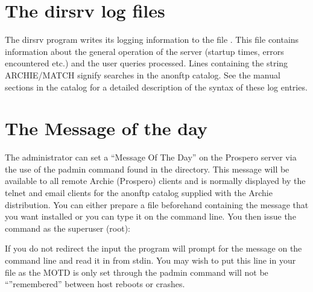 \section{The dirsrv log files}

The dirsrv program writes its logging information to the file
. This file contains information about the general operation of
the server (startup times, errors encountered etc.) and the user queries
processed. Lines containing the string ARCHIE/MATCH signify searches in the
anonftp catalog. See the manual sections in the catalog for a detailed
description of the syntax of these log entries.






\section{The Message of the day}

The administrator can set a ``Message Of The Day'' on the Prospero server via
the use of the padmin command found in the  directory. This
message will be available to all remote Archie (Prospero) clients and is
normally displayed by the telnet and email clients for the anonftp catalog
supplied with the Archie distribution. You can either prepare a file
beforehand containing the message that you want installed or you can type it
on the command line. You then issue the command as the superuser (root):





If you do not redirect the input the program will prompt for the message on
the command line and read it in from stdin. You may wish to put this line in
your  file as the MOTD is only set through the padmin
command will not be ``''remembered'' between host reboots or crashes.


